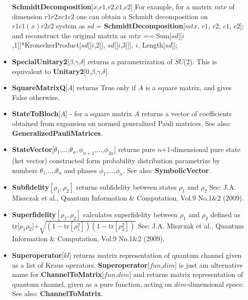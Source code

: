 \documentclass[a4paper,10pt]{scrartcl}
\begin{document}
\begin{itemize}
\indent{} \textbf{SchmidtDecomposition}[$x$,{{$r1$,$r2$},{$c1$,$c2$}}]\newline{}
For example, for a matrix $mtx$ of dimension $r1 r2x c1 c2$ one can obtain a Schmidt decomposition on $r1 c1(x) r2 c2$ system as \newline{}
\indent{} $sd$ = \textbf{SchmidtDecomposition}[$mtx$, {{$r1$, $r2$}, {$c1$, $c2$}}];\newline{}
and reconstruct the original matrix as\newline{}
\indent{} $mtx$ == Sum[$sd$[[$i$,1]]*KroneckerProduct[$sd$[[$i$,2]], $sd$[[$i$,3]]], {$i$, Length[$sd$]}];
\item  \textbf{SpecialUnitary2}[$\text{$\beta $,$\gamma $,$\delta $}$] returns a parametrization of $SU$(2). This is equivalent to \textbf{Unitary2}[$\text{0,$\beta $,$\gamma $,$\delta $}$].
\item  \textbf{SquareMatrixQ}[$A$] returns True only if $A$ is a square matrix, and gives False otherwise.
\item  \textbf{StateToBloch}[$A$] - for a square matrix $A$ returns a vector of coefficients obtained from expansion on normed generalized Pauli matrices. See also: \textbf{GeneralizedPauliMatrices}.
\item  \textbf{StateVector}[{$\theta _1\text{,...,}\theta _n,\phi _{n+1}\text{,...,}\phi _{2 n}$}] returns pure $n$+1-dimensional pure state (ket vector) constructed form probability distribution parametrize by numbers {$\theta _1\text{,...,}\theta _n$} and phases {$\phi _1\text{,...,}\phi _n$}. See also: \textbf{SymbolicVector}.
\item  \textbf{Subfidelity}$\left[\rho _1,\rho _2\right]$ returns subfidelity between states $\rho _1$ and $\rho _2$ See: J.A. Miszczak et al., Quantum Information \& Computation, Vol.9 No.1\&2 (2009).
\item  \textbf{Superfidelity}$\left[\rho _1,\rho _2\right]$ calculates superfidelity between $\rho _1$ and $\rho _2$ defined as $\text{tr[}\rho _1\rho _2\text{]+}\sqrt{\left(1-\text{tr}\left[\rho _1^2\right]\right)\left(1-\text{tr}\left[\rho _2^2\right]\right)}$\newline{}
See: J.A. Miszczak et al., Quantum Information \& Computation, Vol.9 No.1\&2 (2009).
\item  \textbf{Superoperator}[$kl$] returns matrix representation of quantum channel given as a list of Kraus operators. \textbf{Superoperator}[$fun$,$dim$] is just am alternative name for \textbf{ChannelToMatrix}[$fun$,$dim$] and returns matrix representation of quantum channel, given as a pure function, acting on $dim$-dimensional space. See also: \textbf{ChannelToMatrix}.

\end{itemize}
\end{document}
